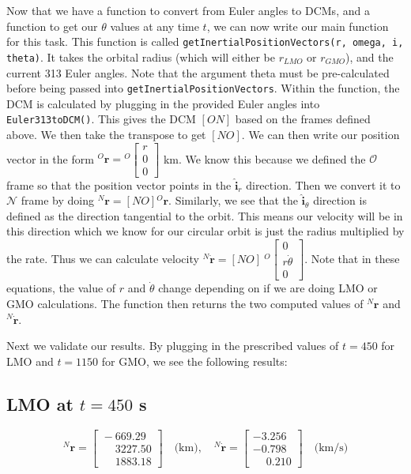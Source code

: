 \documentclass[conf]{new-aiaa}
\begin{document}
Now that we have a function to convert from Euler angles to DCMs, and a function to get our $\theta$ values at any time $t$, we can now write our main function for this task. This function is called \texttt{getInertialPositionVectors(r, omega, i, theta)}. It takes the orbital radius (which will either be $r_{LMO}$ or $r_{GMO}$), and the current 313 Euler angles. Note that the argument theta must be pre-calculated before being passed into \texttt{getInertialPositionVectors}. Within the function, the DCM is calculated by plugging in the provided Euler angles into \texttt{Euler313toDCM()}. This gives the DCM $[ON]$ based on the frames defined above. We then take the transpose to get $[NO]$. We can then write our position vector in the form ${}^O\bm{r} = {}^O\begin{bmatrix}r \\ 0 \\ 0 \end{bmatrix}$ km. We know this because we defined the \(\mathcal{O}\) frame so that the position vector points in the $\hat{\bm{i}}_r$ direction. Then we convert it to \(\mathcal{N}\) frame by doing ${}^N\bm{r} = [NO]{}^O\bm{r}$. Similarly, we see that the $\hat{\bm{i}}_{\theta}$ direction is defined as the direction tangential to the orbit. This means our velocity will be in this direction which we know for our circular orbit is just the radius multiplied by the rate. Thus we can calculate velocity ${}^N\dot{\bm{r}} = [NO]\ {}^O\begin{bmatrix}0 \\ r\dot\theta \\ 0 \end{bmatrix}$. Note that in these equations, the value of $r$ and $\dot\theta$ change depending on if we are doing LMO or GMO calculations. The function then returns the two computed values of ${}^N{\bm{r}}$ and ${}^N\dot{\bm{r}}$.

Next we validate our results. By plugging in the prescribed values of $t=450$ for LMO and $t=1150$ for GMO, we see the following results:
\subsection*{LMO at $t = 450$ s}
\[
{}^N{\bm{r}} = 
\begin{bmatrix}
\phantom{}-669.29 \\ \phantom{-}3227.50 \\ \phantom{-}1883.18
\end{bmatrix} \quad \text{(km)}, \quad
{}^N\dot{\bm{r}} = 
\begin{bmatrix}
-3.256 \\ -0.798 \\ \phantom{-}0.210
\end{bmatrix} \quad \text{(km/s)}
\]
\end{document}
